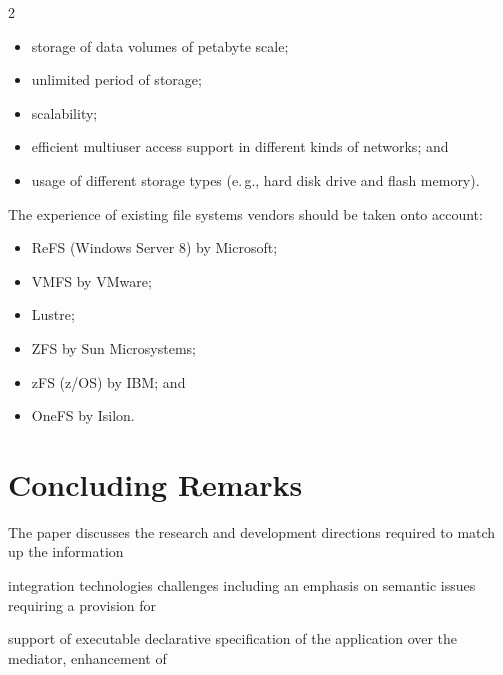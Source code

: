 \begin{multicols}{2}
\begin{itemize}
\item storage of data volumes of petabyte scale;


\item unlimited period of storage;


\item scalability;


\item efficient multiuser access support in different kinds of networks; and


\item usage of different storage types (e.\,g., hard disk drive and flash memory).


\end{itemize}





The experience of existing file systems vendors should be taken onto account:


\begin{itemize}


\item ReFS (Windows Server 8) by Microsoft;


\item VMFS by VMware;


\item Lustre;


\item ZFS by Sun Microsystems;


\item zFS (z/OS) by IBM; and


\item OneFS by Isilon.


\end{itemize}





\section{Concluding Remarks}





\noindent


The paper discusses the research and development directions required to match up the information 


integration technologies challenges including an emphasis on semantic issues requiring a provision for 


support of executable declarative specification of the application over the mediator, enhancement of 



\end{multicols}
